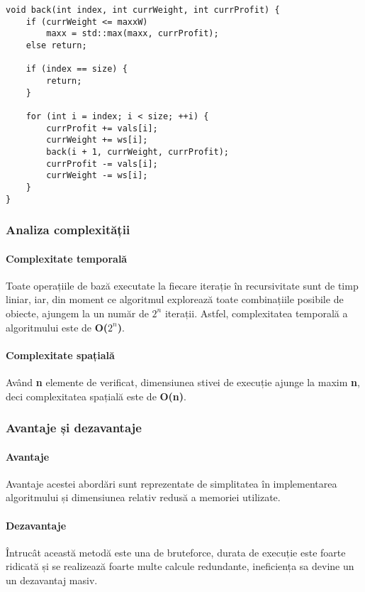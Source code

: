 \documentclass[runningheads]{llncs}
\begin{document}
\begin{lstlisting}
void back(int index, int currWeight, int currProfit) {
	if (currWeight <= maxxW)
		maxx = std::max(maxx, currProfit);
	else return;

	if (index == size) {
		return;
	}

	for (int i = index; i < size; ++i) {
		currProfit += vals[i];
		currWeight += ws[i];
		back(i + 1, currWeight, currProfit);
		currProfit -= vals[i];
		currWeight -= ws[i];
	}
}
\end{lstlisting}

\subsubsection{Analiza complexității}

\paragraph{Complexitate temporală} Toate operațiile de bază executate la fiecare
iterație în recursivitate sunt de timp liniar, iar, din moment ce algoritmul explorează
toate combinațiile posibile de obiecte, ajungem la un număr de $2^n$ iterații. Astfel,
complexitatea temporală a algoritmului este de \textbf{O($2^n$)}.

\paragraph{Complexitate spațială} Având \textbf{n} elemente de verificat, dimensiunea stivei
de execuție ajunge la maxim \textbf{n}, deci complexitatea spațială este de \textbf{O(n)}.

\subsubsection{Avantaje și dezavantaje}

\paragraph{Avantaje} Avantaje acestei abordări sunt reprezentate de simplitatea în implementarea
algoritmului și dimensiunea relativ redusă a memoriei utilizate.

\paragraph{Dezavantaje} Întrucât această metodă este una de bruteforce, durata de execuție este
foarte ridicată și se realizează foarte multe calcule redundante, ineficiența sa devine un
un dezavantaj masiv.
\end{document}
